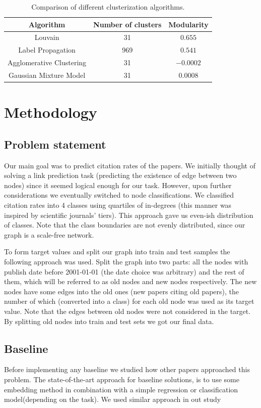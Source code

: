 \begin{table}[h]
\centering
\begin{tabular}{c c c}
\hline\hline
Algorithm & Number of clusters & Modularity \\
\hline
Louvain & 31 & $0.655$ \\
Label Propagation & 969 & $0.541$ \\
Agglomerative Clustering & 31 & $-0.0002$ \\
Gaussian Mixture Model & 31 & $0.0008$ \\
\hline
\end{tabular}
\caption{Comparison of different clusterization algorithms.}
\label{table:clusterization}
\end{table}

\section{Methodology}
\subsection{Problem statement}
\tab Our main goal was to predict citation rates of the papers. We initially thought of solving a link prediction task (predicting the existence of edge between two nodes) since it seemed logical enough for our task. However, upon further considerations we eventually switched to node classifications. We classified citation rates into 4 classes using quartiles of in-degrees (this manner was inspired by scientific journals' tiers). This approach gave us even-ish distribution of classes. Note that the class boundaries are not evenly distributed, since our graph is a scale-free network.

To form target values and split our graph into train and test samples the following approach was used. Split the graph into two parts: all the nodes with publish date before 2001-01-01 (the date choice was arbitrary) and the rest of them, which will be referred to as old nodes and new nodes respectively. The new nodes have some edges into the old ones (new papers citing old papers), the number of which (converted into a class) for each old node was used as its target value. Note that the edges between old nodes were not considered in the target. By splitting old nodes into train and test sets we got our final data.

\subsection{Baseline}
\tab Before implementing any baseline we studied how other papers approached this problem. The state-of-the-art approach for baseline solutions, is to use some embedding method in combination with a simple regression or classification model(depending on the task). We used similar approach in out study

